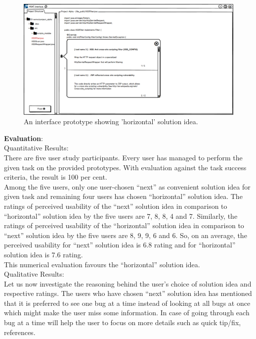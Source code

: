 \begin{figure}[hbt!]
	\centering
	\includegraphics[width=\linewidth]{figures/solution_ideas_snaps/S31_horizontal}
	\caption{An interface prototype showing 'horizontal' solution idea.}
	\label{fig:S31_horizontal}
\end{figure} 


\textbf{Evaluation}: \\

Quantitative Results: \\

There are five user study participants. Every user has managed to perform the given task on the provided prototypes. With evaluation against the task success criteria, the result is 100 per cent. \\

Among the five users, only one user-chosen “next” as convenient solution idea for given task and remaining four users has chosen “horizontal” solution idea. The ratings of perceived usability of the “next” solution idea in comparison to “horizontal” solution idea by the five users are 7, 8, 8, 4 and 7. Similarly, the ratings of perceived usability of the “horizontal” solution idea in comparison to “next” solution idea by the five users are 8, 9, 9, 6 and 6. So, on an average, the perceived usability for “next” solution idea is 6.8 rating and for “horizontal” solution idea is 7.6 rating. \\

This numerical evaluation favours the “horizontal” solution idea. \\

Qualitative Results: \\

Let us now investigate the reasoning behind the user’s choice of solution idea and respective ratings. The users who have chosen “next” solution idea has mentioned that it is preferred to see one bug at a time instead of looking at all bugs at once which might make the user miss some information. In case of going through each bug at a time will help the user to focus on more details such as quick tip/fix, references. \\

